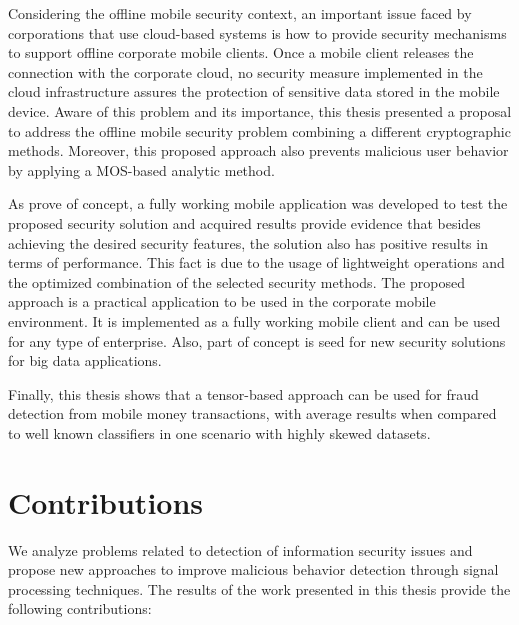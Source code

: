 Considering the offline mobile security context, an important issue faced by corporations that use cloud-based systems is how to provide security mechanisms to support offline corporate mobile clients. Once a mobile client releases the connection with the corporate cloud, no security measure implemented in the cloud infrastructure assures the protection of sensitive data stored in the mobile device. Aware of this problem and its importance, this thesis presented a proposal to address the offline mobile security problem combining a different cryptographic methods. Moreover, this proposed approach also prevents malicious user behavior by applying a MOS-based analytic method. 

As prove of concept, a fully working mobile application was developed to test the proposed security solution and acquired results provide evidence that besides achieving the desired security features, the solution also has positive results in terms of performance. This fact is due to the usage of lightweight operations and the optimized combination of the selected security methods. The proposed approach is a practical application to be used in the corporate mobile environment. It is implemented as a fully working mobile client and can be used for any type of enterprise. Also, part of concept is seed for new security solutions for big data applications. 

Finally, this thesis shows that a tensor-based approach can be used for fraud detection from mobile money transactions, with average results when compared to well known classifiers in one scenario with highly skewed datasets.


\section{Contributions}
\label{sc:conc_contributions}

We analyze problems related to detection of information security issues and propose new approaches to improve malicious behavior detection through signal processing techniques. The results of the work presented in this thesis provide the following contributions:

